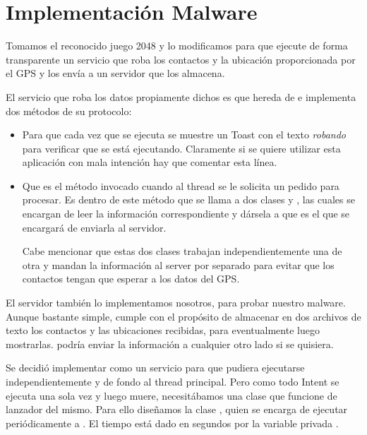 \section{Implementaci\'on Malware}

Tomamos el reconocido juego 2048 y lo modificamos para que ejecute de forma transparente un servicio que roba los contactos y la ubicaci\'on proporcionada por el GPS y los env\'ia a un servidor que los almacena. 

El servicio que roba los datos propiamente dichos es  que hereda de  e implementa dos m\'etodos de su protocolo: 

\begin{itemize}
 \item {} 
 
 Para que cada vez que se ejecuta se muestre un Toast con el texto {\it robando} para verificar que se est\'a ejecutando. Claramente si se quiere utilizar esta aplicaci\'on con mala intenci\'on hay que comentar esta l\'inea. 
 
 \item {}
 
 Que es el m\'etodo invocado cuando al thread se le solicita un pedido para procesar. Es dentro de este m\'etodo que se llama a dos clases  y , las cuales se encargan de leer la informaci\'on correspondiente y d\'arsela a  que es el que se encargar\'a de enviarla al servidor. 
 
 Cabe mencionar que estas dos clases trabajan independientemente una de otra y mandan la informaci\'on al server por separado para evitar que los contactos tengan que esperar a los datos del GPS. 
 
\end{itemize}

El servidor tambi\'en lo implementamos nosotros, para probar nuestro malware. Aunque bastante simple, cumple con el prop\'osito de almacenar en dos archivos de texto los contactos y las ubicaciones recibidas, para eventualmente luego mostrarlas.  podr\'ia enviar la informaci\'on a cualquier otro lado si se quisiera. 

Se decidi\'o implementar  como un servicio para que pudiera ejecutarse independientemente y de fondo al thread principal. Pero como todo Intent se ejecuta una sola vez y luego muere, necesit\'abamos una clase que funcione de lanzador del mismo. Para ello dise\~namos la clase , quien se encarga de ejecutar peri\'odicamente a . El tiempo est\'a dado en segundos por la variable privada . 

